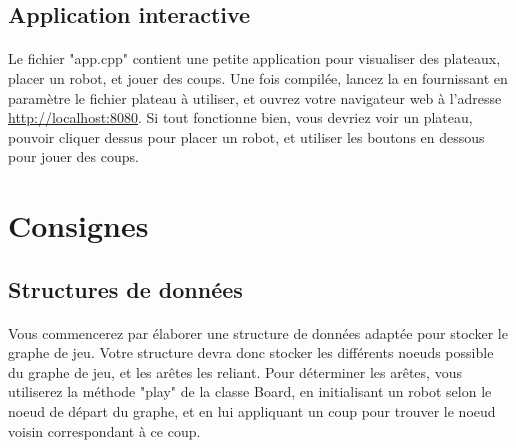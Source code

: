 \documentclass[a4paper]{article}
\begin{document}
\subsection{Application interactive}

\paragraph{}Le fichier "app.cpp" contient une petite application pour visualiser
des plateaux, placer un robot, et jouer des coups. Une fois compilée, lancez la
en fournissant en paramètre le fichier plateau à utiliser, et ouvrez votre
navigateur web à l'adresse \url{http://localhost:8080}. Si tout fonctionne bien,
vous devriez voir un plateau, pouvoir cliquer dessus pour placer un robot, et
utiliser les boutons en dessous pour jouer des coups.

\section{Consignes}

\subsection{Structures de données}

\paragraph{}Vous commencerez par élaborer une structure de données adaptée pour
stocker le graphe de jeu. Votre structure devra donc stocker les différents
noeuds possible du graphe de jeu, et les arêtes les reliant. Pour déterminer les
arêtes, vous utiliserez la méthode "play" de la classe Board, en initialisant un
robot selon le noeud de départ du graphe, et en lui appliquant un coup pour
trouver le noeud voisin correspondant à ce coup.
\end{document}
